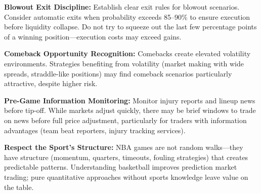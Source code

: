 \textbf{Blowout Exit Discipline:} Establish clear exit rules for blowout scenarios. Consider automatic exits when probability exceeds 85--90\% to ensure execution before liquidity collapse. Do not try to squeeze out the last few percentage points of a winning position---execution costs may exceed gains.

\textbf{Comeback Opportunity Recognition:} Comebacks create elevated volatility environments. Strategies benefiting from volatility (market making with wide spreads, straddle-like positions) may find comeback scenarios particularly attractive, despite higher risk.

\textbf{Pre-Game Information Monitoring:} Monitor injury reports and lineup news before tip-off. While markets adjust quickly, there may be brief windows to trade on news before full price adjustment, particularly for traders with information advantages (team beat reporters, injury tracking services).

\textbf{Respect the Sport's Structure:} NBA games are not random walks---they have structure (momentum, quarters, timeouts, fouling strategies) that creates predictable patterns. Understanding basketball improves prediction market trading; pure quantitative approaches without sports knowledge leave value on the table.
